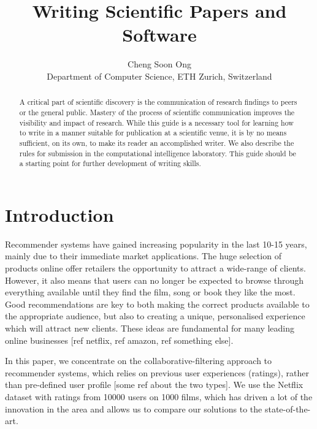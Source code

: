 \documentclass[10pt,conference,compsocconf]{IEEEtran}
\begin{document}
\title{Writing Scientific Papers and Software}

\author{
  Cheng Soon Ong\\
  Department of Computer Science, ETH Zurich, Switzerland
}

\maketitle

\begin{abstract}
  A critical part of scientific discovery is the
  communication of research findings to peers or the general public.
  Mastery of the process of scientific communication improves the
  visibility and impact of research. While this guide is a necessary
  tool for learning how to write in a manner suitable for publication
  at a scientific venue, it is by no means sufficient, on its own, to
  make its reader an accomplished writer. We also describe the rules
  for submission in the computational intelligence laboratory.
  This guide should be a
  starting point for further development of writing skills.
\end{abstract}

\section{Introduction}

Recommender systems have gained increasing popularity in the last 10-15 years, mainly due to their immediate market applications. The huge selection of products online offer retailers the opportunity to attract a wide-range of clients. However, it also means that users can no longer be expected to browse through everything available until they find the film, song or book they like the most. Good recommendations are key to both making the correct products available to the appropriate audience, but also to creating a unique, personalised experience which will attract new clients. These ideas are fundamental for many leading online businesses [ref netflix, ref amazon, ref something else].

In this paper, we concentrate on the collaborative-filtering approach to recommender systems, which relies on previous user experiences (ratings), rather than pre-defined user profile [some ref about the two types]. We use the Netflix dataset with ratings from 10000 users on 1000 films, which has driven a lot of the innovation in the area and allows us to compare our solutions to the state-of-the-art. 
\end{document}
